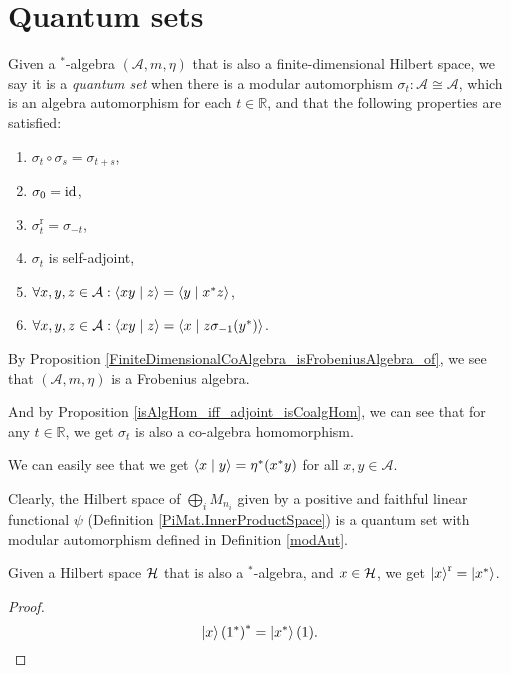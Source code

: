 \chapter{Quantum sets}

 \begin{definition}\label{QuantumSet}
  \leanok
  Given a $^*$-algebra $(\mathcal{A},m,\eta)$ that is also a finite-dimensional Hilbert space,
  we say it is a \textit{quantum set} when there is a modular automorphism $\sigma_t\colon\mathcal{A}\cong\mathcal{A}$, which is an algebra automorphism for each $t\in\mathbb{R}$, and that the following properties are satisfied:
  \begin{enumerate}
   \item $\sigma_t\circ\sigma_s=\sigma_{t+s}$,
   \item $\sigma_0=\operatorname{id}$,
   \item $\sigma_t^{\operatorname{r}}=\sigma_{-t}$,
   \item $\sigma_t$ is self-adjoint,
   \item $\forall{x,y,z}\in\mathcal{A}:\left\langle xy \mid z\right\rangle=\left\langle y \mid x^*z\right\rangle$,
   \item $\forall{x,y,z}\in\mathcal{A}:\left\langle xy \mid z\right\rangle=\left\langle x \mid z\sigma_{-1}(y^*)\right\rangle$.
  \end{enumerate}
  By Proposition \ref{FiniteDimensionalCoAlgebra_isFrobeniusAlgebra_of}, we see that $(\mathcal{A},m,\eta)$ is a Frobenius algebra.

  And by Proposition \ref{isAlgHom_iff_adjoint_isCoalgHom}, we can see that for any $t\in\mathbb{R}$, we get $\sigma_t$ is also a co-algebra homomorphism.

  We can easily see that we get $\left\langle x \mid y\right\rangle=\eta^*(x^*y)$ for all $x,y\in\mathcal{A}$.
 \end{definition}

 Clearly, the Hilbert space of $\bigoplus_iM_{n_i}$ given by a positive and faithful linear functional $\psi$ (Definition \ref{PiMat.InnerProductSpace}) is a quantum set with modular automorphism defined in Definition \ref{modAut}.
 
 \begin{lemma}\label{ket_real}\leanok
  Given a Hilbert space $\mathcal{H}$ that is also a $^*$-algebra, and $x\in\mathcal{H}$, we get $\left\lvert x\right\rangle^{\operatorname{r}}=\left\lvert x^*\right\rangle$.
 \end{lemma}
 \begin{proof}\leanok
  \[{\left\lvert x\right\rangle(1^*)}^*=\left\lvert x^*\right\rangle(1).\]
 \end{proof}


